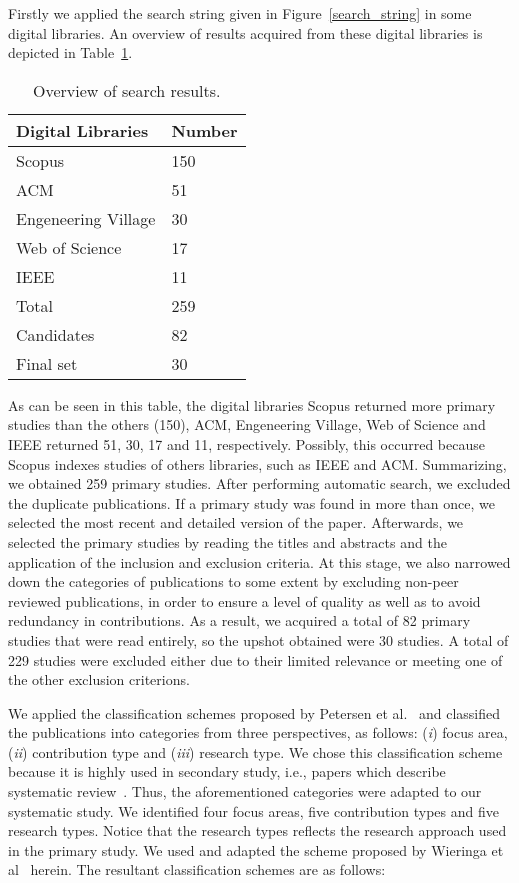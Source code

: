 Firstly we applied the search string given in Figure~\ref{search_string} in some digital libraries. An overview of results acquired from these digital libraries is depicted in Table~\ref{result_digital}.
\begin{table}[!h]
\centering
\caption{Overview of search results.}
\begin{tabular}{p{}p{}}
\hline 
Digital Libraries & Number\tabularnewline
\hline 
Scopus & 150
\\
ACM & 51
\\ 
Engeneering Village & 30
\\
Web of Science & 17
\\
IEEE & 11
\\
Total & 259
\\
Candidates & 82
\\
Final set & 30\tabularnewline
\hline 
\end{tabular}
\label{result_digital}
\end{table} 
As can be seen in this table, the digital libraries Scopus returned more primary studies than the others (150), ACM, Engeneering Village, Web of Science and IEEE returned 51, 30, 17 and 11, respectively. Possibly, this occurred because Scopus indexes studies of others libraries, such as IEEE and ACM. Summarizing, we obtained 259 primary studies. After performing automatic search, we excluded the duplicate publications. If a primary study was found in more than once, we selected the most recent and detailed version of the paper. Afterwards, we selected the primary studies by reading the titles and abstracts and the application of the inclusion and exclusion criteria. At this stage, we also narrowed down the categories of publications to some extent by excluding non-peer reviewed publications, in order to ensure a level of quality as well as to avoid redundancy in contributions. As a result, we acquired a total of 82 primary studies that were read entirely, so the upshot obtained were 30 studies. A total of 229 studies were excluded either due to their limited relevance or meeting one of the other exclusion criterions.

We applied the classification schemes proposed by Petersen et al.~\cite{Petersen:2008:SMS:2227115.2227123} and classified the publications into categories from three perspectives, as follows: (\textit{i}) focus area, (\textit{ii}) contribution type and (\textit{iii}) research type. We chose this classification scheme because it is highly used in secondary study, i.e., papers which describe systematic review~\cite{Durelli:2013:SRM:2480362.2480567}.%
 Thus, the aforementioned categories were adapted to our systematic study. We identified four focus areas, five contribution types and five research types. Notice that the research types reflects the research approach used in the primary study. We used and adapted the scheme proposed by Wieringa et al~\cite{Wieringa:2005:REP:1107677.1107683} herein. The resultant classification schemes are as follows:

